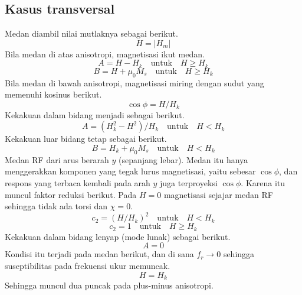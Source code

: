 \documentclass[a4paper,11pt]{article}
\begin{document}
\subsection{Kasus transversal}
Medan diambil nilai mutlaknya sebagai berikut.
\begin{equation*}
H = |H_{m}|
\end{equation*}
Bila medan di atas anisotropi, magnetisasi ikut medan.
\begin{equation*}
A = H-H_{k}\quad\text{untuk}\quad H\ge H_{k}
\end{equation*}
\begin{equation*}
B = H+\mu_{0}M_{s}\quad\text{untuk}\quad H\ge H_{k}
\end{equation*}
Bila medan di bawah anisotropi, magnetisasi miring dengan sudut yang
memenuhi kosinus berikut.
\begin{equation*}
\cos\phi = H/H_{k}
\end{equation*}
Kekakuan dalam bidang menjadi sebagai berikut.
\begin{equation*}
A = (H_{k}^{2}-H^{2})/H_{k}\quad\text{untuk}\quad H<H_{k}
\end{equation*}
Kekakuan luar bidang tetap sebagai berikut.
\begin{equation*}
B = H_{k}+\mu_{0}M_{s}\quad\text{untuk}\quad H<H_{k}
\end{equation*}
Medan RF dari arus berarah $y$ (sepanjang lebar). Medan itu hanya menggerakkan
komponen yang tegak lurus magnetisasi, yaitu sebesar $\cos\phi$, dan respons
yang terbaca kembali pada arah $y$ juga terproyeksi $\cos\phi$.
Karena itu muncul faktor reduksi berikut. Pada $H=0$ magnetisasi sejajar medan
RF sehingga tidak ada torsi dan $\chi=0$.
\begin{equation*}
c_{2} = (H/H_{k})^{2}\quad\text{untuk}\quad H<H_{k}
\end{equation*}
\begin{equation*}
c_{2} = 1\quad\text{untuk}\quad H\ge H_{k}
\end{equation*}
Kekakuan dalam bidang lenyap (mode lunak) sebagai berikut.
\begin{equation*}
A = 0
\end{equation*}
Kondisi itu terjadi pada medan berikut, dan di sana $f_{r}\to 0$ sehingga
suseptibilitas pada frekuensi ukur memuncak.
\begin{equation*}
H = H_{k}
\end{equation*}
Sehingga muncul dua puncak pada plus-minus anisotropi.
\end{document}
